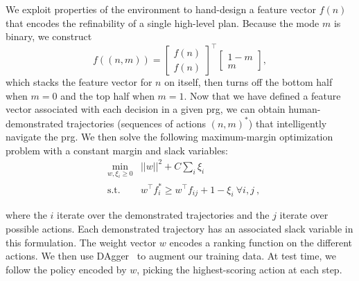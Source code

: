 We exploit properties of the environment to hand-design a feature vector $f(n)$ that encodes the refinability
of a single high-level plan. Because the mode $m$ is binary,
we construct $$f((n, m)) = \begin{bmatrix} f(n) \\ f(n) \end{bmatrix}^\top \begin{bmatrix} 1 - m \\ m \end{bmatrix},$$
which stacks the feature vector for $n$ on itself, then turns off the bottom half when $m = 0$ and the
top half when $m = 1$. Now that we have defined a feature vector associated with each decision in a given {\sc prg},
we can obtain human-demonstrated trajectories (sequences of actions $(n, m)^{*}$) that intelligently
navigate the {\sc prg}. We then solve the following maximum-margin optimization problem with a constant margin and slack variables:
\begin{align*}
&\min_{w, \xi_i \geq 0} & ||w||^2 + C \sum_i \xi_i\\
&\text{s.t.} & w^{\top}f^*_i \geq w^{\top}f_{ij} + 1 - \xi_{i}\ \forall i, j \ ,
\end{align*}

where the $i$ iterate over the demonstrated trajectories and the $j$ iterate over possible actions. Each
demonstrated trajectory has an associated slack variable in this formulation.
The weight vector $w$ encodes a ranking function on the different actions.
We then use {\sc DAgger}~\cite{dagger} to augment our training data. At test time, we follow the policy encoded by
$w$, picking the highest-scoring action at each step.

